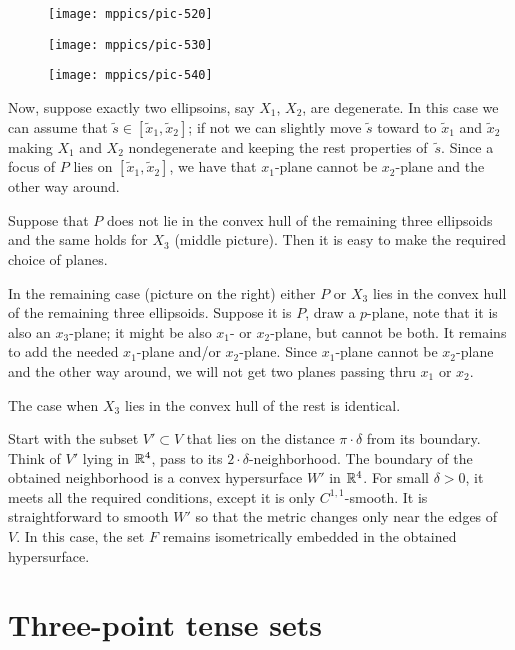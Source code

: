 \documentclass{article}
\begin{document}
\begin{figure}[!ht]
\begin{minipage}{.3\textwidth}
\centering
\texttt{[image: mppics/pic-520]}
\end{minipage}
\hfill
\begin{minipage}{.3\textwidth}
\centering
\texttt{[image: mppics/pic-530]}
\end{minipage}
\hfill
\begin{minipage}{.3\textwidth}
\centering
\texttt{[image: mppics/pic-540]}
\end{minipage}
\end{figure}

Now, suppose exactly two ellipsoins, say $X_1$, $X_2$, are degenerate.
In this case we can assume that $\tilde s\in[\tilde x_1,\tilde x_2]$;
if not we can slightly move $\tilde s$ toward to $\tilde x_1$ and $\tilde x_2$ making $X_1$ and $X_2$ nondegenerate and keeping the rest properties of~$\tilde s$.
Since a focus of $P$ lies on $[\tilde x_1,\tilde x_2]$, we have that $x_1$-plane cannot be $x_2$-plane and the other way around.

Suppose that $P$ does not lie in the convex hull of the remaining three ellipsoids
and the same holds for $X_3$ (middle picture).
Then it is easy to make the required choice of planes.

In the remaining case (picture on the right) either $P$ or $X_3$ lies in the convex hull of the remaining three ellipsoids.
Suppose it is $P$, draw a $p$-plane, note that it is also an $x_3$-plane;
it might be also $x_1$- or $x_2$-plane, but cannot be both.
It remains to add the needed $x_1$-plane and/or $x_2$-plane.
Since $x_1$-plane cannot be $x_2$-plane and the other way around, we will not get two planes passing thru $x_1$ or $x_2$.

The case when $X_3$ lies in the convex hull of the rest is identical.

Start with the subset $V'\subset V$ that lies on the distance $\pi\cdot\delta$ from its boundary.
Think of $V'$ lying in $\mathbb{R}^4$, pass to its $2\cdot \delta$-neighborhood.
The boundary of the obtained neighborhood is a convex hypersurface $W'$ in $\mathbb{R}^4$.
For small $\delta>0$, it meets all the required conditions, except it is only $C^{1,1}$-smooth.
It is straightforward to smooth $W'$ so that the metric changes only near the edges of~$V$.
In this case, the set $F$ remains isometrically embedded in the obtained hypersurface.
\qeds


\section{Three-point tense sets}\label{sec:3-tense}
\end{document}
